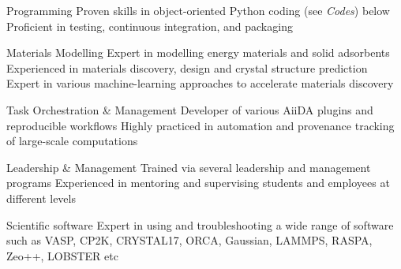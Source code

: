 


\begin{cvskillsnoncentered}

\cvskill
{Programming} %
{Proven skills in object-oriented Python coding (see \textit{Codes}) below}
\cvskill
{}
{Proficient in testing, continuous integration, and packaging}


\cvskill
{Materials Modelling} %
{Expert in modelling energy materials and solid adsorbents}
\cvskill
{}
{Experienced in materials discovery, design and crystal structure prediction}
\cvskill
{}
{Expert in various machine-learning approaches to accelerate materials discovery}

\cvskill
{Task Orchestration \& Management}
{Developer of various AiiDA plugins and reproducible workflows} 
\cvskill
{}
{Highly practiced in automation and provenance tracking of large-scale computations}

\cvskill
{Leadership \& Management} %
{Trained via several leadership and management programs}
\cvskill
{}
{Experienced in mentoring and supervising students and employees at different levels}

\cvskill
{Scientific software} %
{Expert in using and troubleshooting a wide range of software such as} 
\cvskill
{}
{VASP, CP2K, CRYSTAL17, ORCA, Gaussian, LAMMPS, RASPA, Zeo++, LOBSTER etc}
\end{cvskillsnoncentered}

